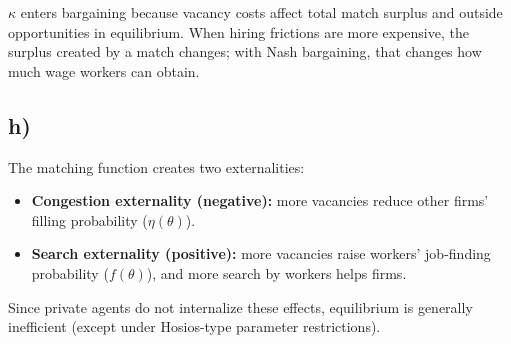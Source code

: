\documentclass[12pt]{article}
\begin{document}
\(\kappa\) enters bargaining because vacancy costs affect total match surplus and outside opportunities in equilibrium. When hiring frictions are more expensive, the surplus created by a match changes; with Nash bargaining, that changes how much wage workers can obtain.


\subsection{h)}

The matching function creates two externalities:

\begin{itemize}
    \item \textbf{Congestion externality (negative):} more vacancies reduce other firms’ filling probability (\(\eta(\theta)\)).
    \item \textbf{Search externality (positive):} more vacancies raise workers’ job-finding probability (\(f(\theta)\)), and more search by workers helps firms.
\end{itemize}

Since private agents do not internalize these effects, equilibrium is generally inefficient (except under Hosios-type parameter restrictions).
\end{document}
